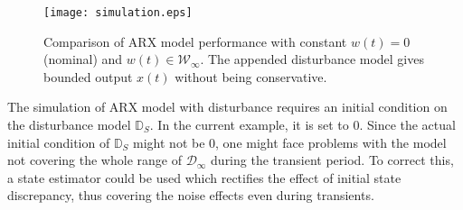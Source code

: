 \documentclass[letterpaper, 10 pt, conference]{ieeeconf}  %
\begin{document}
	\begin{figure}[h]
		\hspace{22pt}
		\texttt{[image: simulation.eps]}
		\caption{Comparison of ARX model performance with constant $w(t)=0$(nominal) and $w(t)\in \mathcal{W}_{\infty}$. The appended disturbance model gives bounded output $x(t)$ without being conservative.}
		\label{simulation}
	\end{figure} 
	The simulation of ARX model with disturbance requires an initial condition on the disturbance model $\mathbb{D}_S$. In the current example, it is set to $0$. Since the actual initial condition of $\mathbb{D}_S$ might not be $0$, one might face problems with the model not covering the whole range of $\mathcal{D}_{\infty}$ during the transient period. To correct this, a state estimator could be used which rectifies the effect of initial state discrepancy, thus covering the noise effects even during transients.
	\fi
\end{document}
